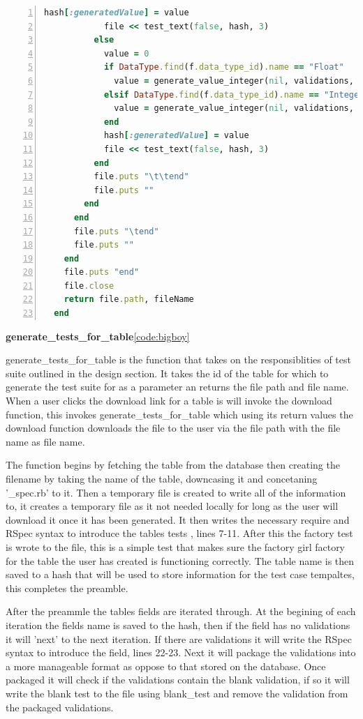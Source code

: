 \documentclass[a4paper,12pt]{article}
\begin{document}
\begin{lstlisting}[frame=single,numbers=left,language = ruby,caption= {generate\_tests\_for\_table}, label={code:bigboy}]
            hash[:generatedValue] = value
            file << test_text(false, hash, 3)
          else
            value = 0
            if DataType.find(f.data_type_id).name == "Float"
              value = generate_value_integer(nil, validations, "Float")
            elsif DataType.find(f.data_type_id).name == "Integer"
              value = generate_value_integer(nil, validations, "Integer")
            end
            hash[:generatedValue] = value
            file << test_text(false, hash, 3)
          end
          file.puts "\t\tend"
          file.puts ""
        end
      end
      file.puts "\tend"
      file.puts ""
    end
    file.puts "end"
    file.close
    return file.path, fileName
  end
\end{lstlisting}
\par \textbf{generate\_tests\_for\_table}\ref{code:bigboy}
\par generate\_tests\_for\_table is the function that takes on the responsiblities of test suite outlined in the design section. It takes the id of the table for which to generate the test suite for as a parameter an returns the file path and file name. When a user clicks the download link for a table is will invoke the download function, this invokes generate\_tests\_for\_table which using its return values the download function downloads the file to the user via the file path with the file name as file name.
\par The function begins by fetching the table from the database then creating the filename by taking the name of the table, downcasing it and concetaning '\_spec.rb' to it. Then a temporary file is created to write all of the information to, it creates a temporary file as it not needed locally for long as the user will download it once it has been generated. It then writes the necessary require and RSpec syntax to introduce the tables tests , lines 7-11. After this the factory test is wrote to the file, this is a simple test that makes sure the factory girl factory for the table the user has created is functioning correctly. The table name is then saved to a hash that will be used to store information for the test case tempaltes, this completes the preamble.
\par After the preammle the tables fields are iterated through. At the begining of each iteration the fields name is saved to the hash, then if the field has no validations it will 'next' to the next iteration. If there are validations it will write the RSpec syntax to introduce the field, lines 22-23. Next it will package the validations into a more manageable format as oppose to that stored on the database. Once packaged it will check if the validations contain the blank validation, if so it will write the blank test to the file using blank\_test and remove the validation from the packaged validations. 
\end{document}
